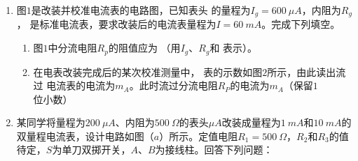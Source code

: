 \begin{enumerate}[leftmargin=0em]


\newpage


\item 
{}
图$ 1 $是改装并校准电流表的电路图，已知表头 \mammetermytikz 的量程为$ I_{g} =600 \ \mu A $，内阻为$ R_{g} $， \mammetermytikz 是标准电流表，要求改装后的电流表量程为$ I=60 \ mA $。完成下列填空。


\begin{enumerate}
\renewcommand{\labelenumi}{\arabic{enumi}.}
\item
图$ 1 $中分流电阻$ R_p $的阻值应为  （用$ I_{g} $、$ R_{g} $和  表示）。
\begin{figure}[h!]
\centering

\end{figure}

\item 
在电表改装完成后的某次校准测量中， \mammetermytikz 表的示数如图$ 2 $所示，由此读出流过 \mammetermytikz 电流表的电流为$ m_{A} $。此时流过分流电阻$ R_P $的电流为$ m_{A} $（保留$ 1 $位小数）



\end{enumerate}


\item
{}
某同学将量程为$ 200 \ \mu A $、内阻为$ 500 \ \Omega $的表头$ \mu A $改装成量程为$ 1 \ mA $和$ 10 \ mA $的双量程电流表，设计电路如图（$ a $）所示。定值电阻$ R_{1} =500 \ \Omega $，$ R_{2} $和$ R_{3} $的值待定，$ S $为单刀双掷开关，$ A $、$ B $为接线柱。回答下列问题：
\begin{figure}[h!]
\centering

\end{figure}


\end{enumerate}
